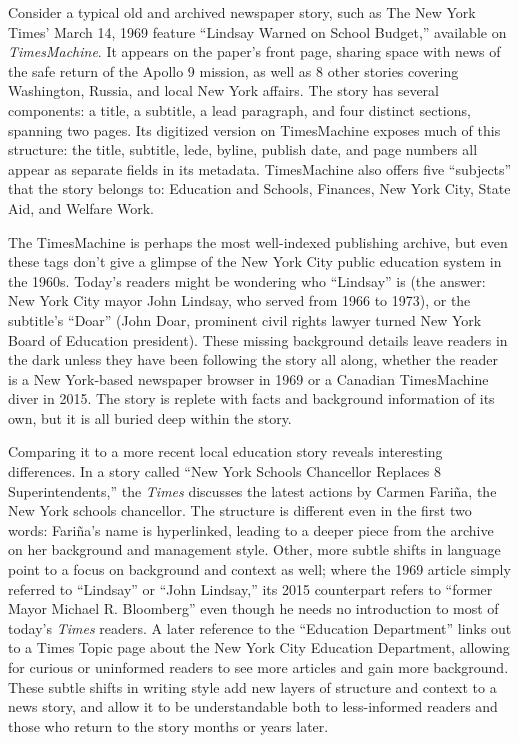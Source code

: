 Consider a typical old and archived newspaper story, such as The New York Times' March 14, 1969 feature ``Lindsay Warned on School Budget,'' available on \emph{TimesMachine}. It appears on the paper's front page, sharing space with news of the safe return of the Apollo 9 mission, as well as 8 other stories covering Washington, Russia, and local New York affairs. The story has several components: a title, a subtitle, a lead paragraph, and four distinct sections, spanning two pages. Its digitized version on TimesMachine exposes much of this structure: the title, subtitle, lede, byline, publish date, and page numbers all appear as separate fields in its metadata. TimesMachine also offers five ``subjects'' that the story belongs to: Education and Schools, Finances, New York City, State Aid, and Welfare Work.\autocite{bennett_lindsay_1969}

The TimesMachine is perhaps the most well-indexed publishing archive, but even these tags don't give a glimpse of the New York City public education system in the 1960s. Today's readers might be wondering who ``Lindsay'' is (the answer: New York City mayor John Lindsay, who served from 1966 to 1973), or the subtitle's ``Doar'' (John Doar, prominent civil rights lawyer turned New York Board of Education president). These missing background details leave readers in the dark unless they have been following the story all along, whether the reader is a New York-based newspaper browser in 1969 or a Canadian TimesMachine diver in 2015. The story is replete with facts and background information of its own, but it is all buried deep within the story.

Comparing it to a more recent local education story reveals interesting differences. In a story called ``New York Schools Chancellor Replaces 8 Superintendents,'' the \emph{Times} discusses the latest actions by Carmen Fari\~{n}a, the New York schools chancellor.\autocite{taylor_new_2014} The structure is different even in the first two words: Fari\~{n}a's name is hyperlinked, leading to a deeper piece from the archive on her background and management style. Other, more subtle shifts in language point to a focus on background and context as well; where the 1969 article simply referred to ``Lindsay'' or ``John Lindsay,'' its 2015 counterpart refers to ``former Mayor Michael R. Bloomberg'' even though he needs no introduction to most of today's \emph{Times} readers. A later reference to the ``Education Department'' links out to a Times Topic page about the New York City Education Department, allowing for curious or uninformed readers to see more articles and gain more background. These subtle shifts in writing style add new layers of structure and context to a news story, and allow it to be understandable both to less-informed readers and those who return to the story months or years later.

